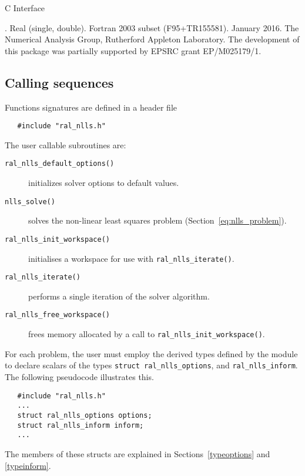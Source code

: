 \documentclass{spec}
\begin{document}
\hslheader

\begin{center}
\huge \sc  C Interface
\end{center}

\hslsummary



\hslattributes
\hslversions{\versionum\ (\versiondate)}.
\hslIRDCZ Real (single, double).
\hsllanguage Fortran 2003 subset (F95+TR155581).
\hsldate January 2016.
\hslorigin The Numerical Analysis Group, Rutherford Appleton Laboratory.
\hslremark The development of this package was
partially supported by EPSRC grant EP/M025179/1.

\newpage
\hslhowto

\subsection{Calling sequences}

Functions signatures are defined in a header file
\begin{verbatim}
   #include "ral_nlls.h"
\end{verbatim}
\medskip

\noindent The user callable subroutines are:
\vspace{-0.1cm}
\begin{description}
   \item[\texttt{ral\_nlls\_default\_options()}] initializes solver options to default values.
   \item[\texttt{nlls\_solve()}]  solves the non-linear least squares problem (Section~\ref{eq:nlls_problem}).
   \item[\texttt{ral\_nlls\_init\_workspace()}] initialises a workspace for use with \texttt{ral\_nlls\_iterate()}.
   \item[\texttt{ral\_nlls\_iterate()}] performs a single iteration of the solver algorithm.
   \item[\texttt{ral\_nlls\_free\_workspace()}] frees memory allocated by a call to \texttt{ral\_nlls\_init\_workspace()}.
\end{description}


\hsltypes
\label{derived types}
For each problem, the user must employ the derived types defined by the
module to declare scalars of the types {\tt struct ral\_nlls\_options}, and
{\tt ral\_nlls\_inform}.
The following pseudocode illustrates this.
\begin{verbatim}
   #include "ral_nlls.h"
   ...
   struct ral_nlls_options options;
   struct ral_nlls_inform inform;
   ...
\end{verbatim}
The members of these structs are explained
in Sections~\ref{typeoptions} and \ref{typeinform}.
\end{document}
